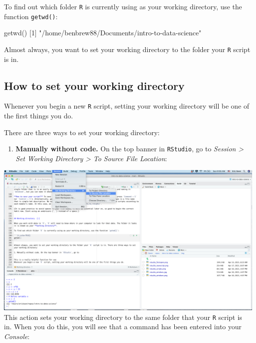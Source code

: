 \documentclass[
]{book}
\newenvironment{Shaded}{\begin{snugshade}}{\end{snugshade}}
\newcommand{\DecValTok}[1]{\textcolor[rgb]{0.00,0.00,0.81}{#1}}
\newcommand{\FunctionTok}[1]{\textcolor[rgb]{0.00,0.00,0.00}{#1}}
\newcommand{\NormalTok}[1]{#1}
\newcommand{\StringTok}[1]{\textcolor[rgb]{0.31,0.60,0.02}{#1}}
\providecommand{\tightlist}{%
  \setlength{\itemsep}{0pt}\setlength{\parskip}{0pt}}
\begin{document}
To find out which folder \texttt{R} is currently using as your working directory, use the function \texttt{getwd()}:

\begin{Shaded}
\begin{Highlighting}[]
\FunctionTok{getwd}\NormalTok{()}
\NormalTok{[}\DecValTok{1}\NormalTok{] }\StringTok{"/home/benbrew88/Documents/intro{-}to{-}data{-}science"}
\end{Highlighting}
\end{Shaded}

Almost always, you want to set your working directory to the folder your \texttt{R} script is in.

\hypertarget{how-to-set-your-working-directory}{%
\subsection*{How to set your working directory}\label{how-to-set-your-working-directory}}

Whenever you begin a new \texttt{R} script, setting your working directory will be one of the first things you do.

There are three ways to set your working directory:

\begin{enumerate}
\def\labelenumi{\arabic{enumi}.}
\tightlist
\item
  \textbf{Manually without code.} On the top banner in \texttt{RStudio}, go to \emph{Session \textgreater{} Set Working Directory \textgreater{} To Source File Location}:
\end{enumerate}

\includegraphics{img/rstudio_setwd.png}
This action sets your working directory to the same folder that your \texttt{R} script is in. When you do this, you will see that a command has been entered into your \emph{Console}:
\end{document}
